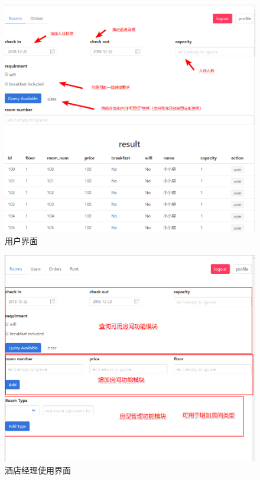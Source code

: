 \documentclass{myreport}
\begin{document}
\begin{figure}[htp]
    \centering
    \includegraphics[width=15cm]{figure/2018-12-22-14-57-11.png}
    \caption{用户界面}
    \label{fig:user-mode}
\end{figure}

\begin{figure}[htp]
    \centering
    \includegraphics[width=15cm]{figure/2018-12-22-15-00-55.png}
    \caption{酒店经理使用界面}
    \label{fig:admin-mode}
\end{figure}
\end{document}

